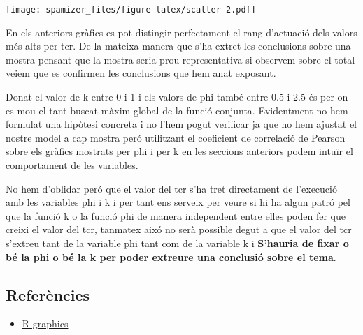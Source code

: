 \documentclass[]{article}
\providecommand{\tightlist}{%
  \setlength{\itemsep}{0pt}\setlength{\parskip}{0pt}}
\begin{document}
\texttt{[image: spamizer\_files/figure-latex/scatter-2.pdf]}

En els anteriors gràfics es pot distingir perfectament el rang
d'actuació dels valors més alts per tcr. De la mateixa manera que s'ha
extret les conclusions sobre una mostra pensant que la mostra seria prou
representativa si observem sobre el total veiem que es confirmen les
conclusions que hem anat exposant.

Donat el valor de k entre 0 i 1 i els valors de phi també entre 0.5 i
2.5 és per on es mou el tant buscat màxim global de la funció conjunta.
Evidentment no hem formulat una hipòtesi concreta i no l'hem pogut
verificar ja que no hem ajustat el nostre model a cap mostra peró
utilitzant el coeficient de correlació de Pearson sobre els gràfics
mostrats per phi i per k en les seccions anteriors podem intuïr el
comportament de les variables.

No hem d'oblidar peró que el valor del tcr s'ha tret directament de
l'execució amb les variables phi i k i per tant ens serveix per veure si
hi ha algun patró pel que la funció k o la funció phi de manera
independent entre elles poden fer que creixi el valor del tcr, tanmatex
aixó no serà possible degut a que el valor del tcr s'extreu tant de la
variable phi tant com de la variable k i \textbf{S'hauria de fixar o bé
la phi o bé la k per poder extreure una conclusió sobre el tema}.

\hypertarget{referencies}{%
\subsection{Referències}\label{referencies}}

\begin{itemize}
\tightlist
\item
  \href{https://bl.ocks.org/patilv/raw/7360425/}{R graphics}
\end{itemize}
\end{document}
